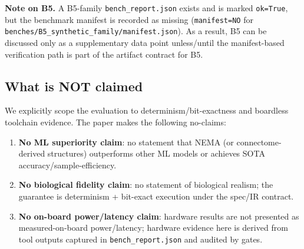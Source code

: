 \textbf{Note on B5.} A B5-family \texttt{bench\_report.json} exists and is marked \texttt{ok=True}, but the benchmark manifest is recorded as missing (\texttt{manifest=NO} for \texttt{benches/B5\_synthetic\_family/manifest.json}). As a result, B5 can be discussed only as a supplementary data point unless/until the manifest-based verification path is part of the artifact contract for B5.

\subsection{What is NOT claimed}

We explicitly scope the evaluation to determinism/bit-exactness and boardless toolchain evidence. The paper makes the following no-claims:
\begin{enumerate}
\item \textbf{No ML superiority claim}: no statement that NEMA (or connectome-derived structures) outperforms other ML models or achieves SOTA accuracy/sample-efficiency.
\item \textbf{No biological fidelity claim}: no statement of biological realism; the guarantee is determinism + bit-exact execution under the spec/IR contract.
\item \textbf{No on-board power/latency claim}: hardware results are not presented as measured-on-board power/latency; hardware evidence here is derived from tool outputs captured in \texttt{bench\_report.json} and audited by gates.
\end{enumerate}
